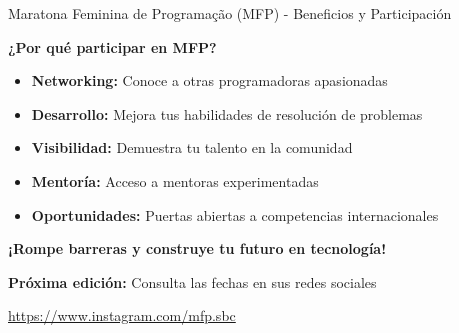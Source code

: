 \documentclass{beamer}
\begin{document}
\begin{frame}{Maratona Feminina de Programação (MFP) - Beneficios y Participación}
\begin{center}
\Large
\textbf{¿Por qué participar en MFP?}

\vspace{0.3cm}

\normalsize
\begin{itemize}
\item \textbf{Networking:} Conoce a otras programadoras apasionadas
\item \textbf{Desarrollo:} Mejora tus habilidades de resolución de problemas
\item \textbf{Visibilidad:} Demuestra tu talento en la comunidad
\item \textbf{Mentoría:} Acceso a mentoras experimentadas
\item \textbf{Oportunidades:} Puertas abiertas a competencias internacionales
\end{itemize}

\vspace{0.3cm}

\textbf{¡Rompe barreras y construye tu futuro en tecnología!}

\vspace{0.2cm}

\normalsize
\textbf{Próxima edición:} Consulta las fechas en sus redes sociales

\vspace{0.1cm}

\small
\url{https://www.instagram.com/mfp.sbc}
\end{center}
\end{frame}
\end{document}
